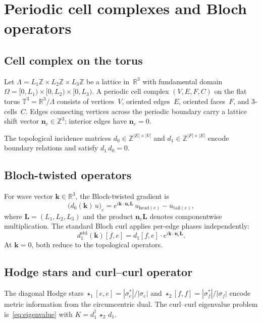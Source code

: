 \documentclass[11pt]{article}
\theoremstyle{remark}
\newcommand{\bk}{\mathbf{k}}
\newcommand{\bL}{\mathbf{L}}
\newcommand{\bn}{\mathbf{n}}
\newcommand{\RR}{\mathbb{R}}
\newcommand{\ZZ}{\mathbb{Z}}
\newcommand{\TT}{\mathbb{T}}
\begin{document}
\section{Periodic cell complexes and Bloch operators}\label{sec:setup}

\subsection{Cell complex on the torus}

Let $\Lambda = L_1\ZZ \times L_2\ZZ \times L_3\ZZ$ be a lattice in~$\RR^3$
with fundamental domain $\Omega = [0,L_1) \times [0,L_2) \times [0,L_3)$.
A periodic cell complex $(V, E, F, C)$ on the flat torus
$\TT^3 = \RR^3/\Lambda$ consists of vertices~$V$, oriented edges~$E$,
oriented faces~$F$, and 3-cells~$C$. Edges connecting vertices across
the periodic boundary carry a lattice shift vector $\bn_e \in \ZZ^3$;
interior edges have $\bn_e = 0$.

The topological incidence matrices $d_0 \in \ZZ^{|E|\times|V|}$ and
$d_1 \in \ZZ^{|F|\times|E|}$ encode boundary relations and satisfy
$d_1\,d_0 = 0$.

\subsection{Bloch-twisted operators}

For wave vector $\bk \in \RR^3$, the Bloch-twisted gradient is
\begin{equation}\label{eq:d0k}
\bigl(d_0(\bk)\,u\bigr)_e
= e^{i\bk \cdot \bn_e \bL}\,u_{\mathrm{head}(e)} - u_{\mathrm{tail}(e)},
\end{equation}
where $\bL = (L_1, L_2, L_3)$ and the product $\bn_e\bL$ denotes
componentwise multiplication. The standard Bloch curl applies per-edge
phases independently:
\begin{equation}\label{eq:d1std}
d_1^{\mathrm{std}}(\bk)[f,e] = d_1[f,e] \cdot e^{i\bk \cdot \bn_e \bL}.
\end{equation}
At $\bk = 0$, both reduce to the topological operators.

\subsection{Hodge stars and curl--curl operator}

The diagonal Hodge stars $\star_1[e,e] = |\sigma^*_e|/|\sigma_e|$ and
$\star_2[f,f] = |\sigma^*_f|/|\sigma_f|$ encode metric information from
the circumcentric dual. The curl--curl eigenvalue problem
is~\eqref{eq:eigenvalue} with $K = d_1^\dagger\,\star_2\,d_1$.
\end{document}
